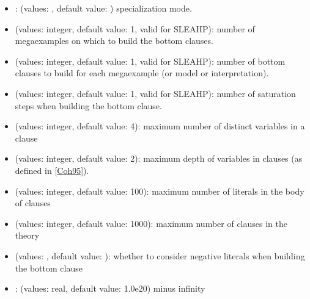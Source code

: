 \documentclass[letterpaper,10pt,english]{sphinxmanual}
\begin{document}
\begin{itemize}
\begin{itemize}
\item {} 
\sphinxAtStartPar
{}: (values: , default value: ) specialization mode.

\item {} 
\sphinxAtStartPar
{} (values: integer, default value: 1, valid for SLEAHP): number of mega\sphinxhyphen{}examples on which to build the bottom clauses.

\item {} 
\sphinxAtStartPar
{} (values: integer, default value: 1, valid for SLEAHP): number of bottom clauses to build for each mega\sphinxhyphen{}example (or model or interpretation).

\item {} 
\sphinxAtStartPar
{} (values: integer, default value: 1, valid for SLEAHP): number of saturation steps when building the bottom clause.

\item {} 
\sphinxAtStartPar
{} (values: integer, default value: 4): maximum number of distinct variables in a clause

\item {} 
\sphinxAtStartPar
{} (values: integer, default value: 2): maximum depth of variables in clauses (as defined in {[}\hyperlink{cite.index:id23}{Coh95}{]}).

\item {} 
\sphinxAtStartPar
{} (values: integer, default value: 100): maximum number of literals in the body of clauses

\item {} 
\sphinxAtStartPar
{} (values: integer, default value: 1000): maximum number of clauses in the theory

\item {} 
\sphinxAtStartPar
{} (values: , default value: ): whether to consider negative literals when building the bottom clause

\item {} 
\sphinxAtStartPar
{}: (values: real, default value: \sphinxhyphen{}1.0e20) minus infinity


\end{itemize}
\end{itemize}
\end{document}
